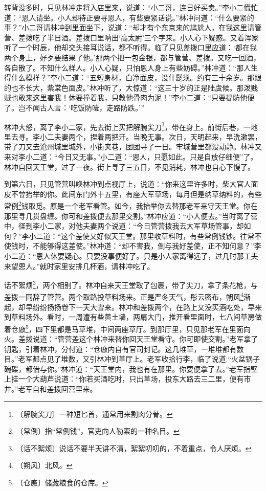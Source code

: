 \documentclass[12pt,UTF-8,openany]{ctexbook}
\begin{document}
\begin{large}
    转背没多时，只见林冲走将入店里来，说道：“小二哥，连日好买卖。”李小二慌忙道：“恩人请坐。小人却待正要寻恩人，有些要紧话说。”林冲问道：“什么要紧的事？”小二哥请林冲到里面坐下，说道：“却才有个东京来的尴尬人，在我这里请管营、差拨吃了半日酒。差拨口里呐出‘高太尉’三个字来。小人心下疑惑。又着浑家听了一个时辰，他却交头接耳说话，都不听得。临了只见差拨口里应道：‘都在我两个身上，好歹要结果了他。’那两个把一包金银，都与管营、差拨。又吃一回酒，各自散了。不知什么样人。小人心疑，只怕恩人身上有些妨碍。”林冲道：“那人生得什么模样？”李小二道：“五短身材，白净面皮，没什髭须。约有三十余岁。那跟的也不长大，紫棠色面皮。”林冲听了，大惊道：“这三十岁的正是陆虞候。那泼贱贼也敢来这里害我！休要撞着我，只教他骨肉为泥！”李小二道：“只要提防他便了。岂不闻古人言：‘吃饭防噎，走路防跌。’”
    
    林冲大怒，离了李小二家，先去街上买把解腕尖刀\footnote{〔解腕尖刀〕一种短匕首，通常用来割肉分骨。}，带在身上。前街后巷，一地里去寻。李小二夫妻两个，捏着两把汗。当晚无事。次日，天明起来，早洗漱罢，带了刀又去沧州城里城外，小街夹巷，团团寻了一日。牢城营里都没动静。林冲又来对李小二道：“今日又无事。”小二道：“恩人，只愿如此。只是自放仔细便”了。林冲自回天王堂，过了一夜。街上寻了三五日，不见消耗，林冲也自心下慢了。
    
    到第六日，只见管营叫唤林冲到点视厅上，说道：“你来这里许多时，柴大官人面皮不曾抬举的你。此间东门外十五里，有座大军草场，每月但是纳草纳料的，有些常例\footnote{〔常例〕指“常例钱”，官吏向人勒索的一种名目。}钱取觅。原是一个老军看管。如今，我抬举你去替那老军来守天王堂。你在那里寻几贯盘缠。你可和差拨便去那里交割。”林冲应道：“小人便去。”当时离了营中，径到李小二家，对他夫妻两个说道：“今日管营拨我去大军草场管事，却如何？”李小二道：“这个差使又好似天王堂。那里收草料时，有些常例钱钞。往常不使钱时，不能够得这差使。”林冲道：“却不害我，倒与我好差使，正不知何意？”李小二道：“恩人休要疑心。只要没事便好了。只是小人家离得远了，过几时那工夫来望恩人。”就时家里安排几杯酒，请林冲吃了。
    
    话不絮烦\footnote{〔话不絮烦〕说话不要半天讲不清，絮絮叨叨的，不着重点，令人厌烦。}，两个相别了。林冲自来天王堂取了包裹，带了尖刀，拿了条花枪，与差拨一同辞了管营。两个取路投草料场来。正是严冬天气，彤云密布，朔风\footnote{〔朔风〕北风。}渐起，却早纷纷扬扬卷下一天大雪来。林冲和差拨两个，在路上又没买酒吃处，早来到草料场外。看时，一周遭有些黄土墙，两扇大门，推开看里面时，七八间草房做着仓廒\footnote{〔仓廒〕储藏粮食的仓库。}，四下里都是马草堆，中间两座草厅。到那厅里，只见那老军在里面向火。差拨说道：“管营差这个林冲来替你回天王堂看守。你可即使交割。”老军拿了钥匙，引着林冲，分付道：“仓廒内自有官司封记。这几堆草，一堆堆都有数目。”老军都点见了堆数，又引林冲到草厅上。老军收拾行李，临了说道:“火盆锅子碗碟，都借与你。”林冲道：“天王堂内，我也有在那里。你要便拿了去。”老军指壁上挂一个大葫芦说道：“你若买酒吃时，只出草场，投东大路去三二里，便有市井。”老军自和差拨回营里来。
    

\end{large}
\end{document}
